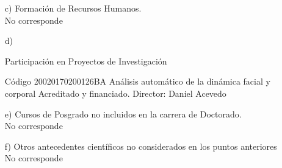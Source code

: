 \begin{enumerate}[leftmargin=0.8cm]
{\begin{itemize}[leftmargin=0.2cm]
    \end{itemize}
  }

  \item[c)]{Formación de Recursos Humanos.
    \\ No corresponde
  }

  \item[d)]{Participación en Proyectos de Investigación
    \begin{itemize}[leftmargin=0.2cm]

    {Código 20020170200126BA}
    {Análisis automático de la dinámica facial y corporal}
    {Acreditado y financiado. Director: Daniel Acevedo}

    \end{itemize}
  }

  \item[e)]{Cursos de Posgrado no incluidos en la carrera de Doctorado.
    \\ No corresponde
  }

  \item[f)]{Otros antecedentes científicos no considerados en los puntos anteriores
    \\ No corresponde
  }

\end{enumerate}
